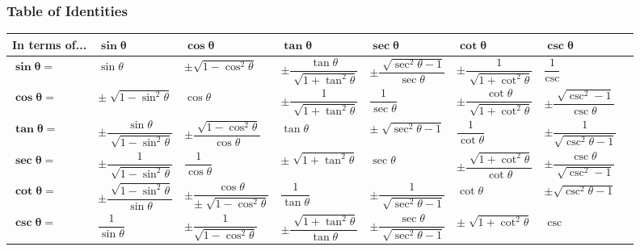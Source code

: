 \documentclass[]{report}
\begin{document}
\subsubsection{Table of Identities}
\begin{tabular}{ |l|l|l|l|l|l|l|l| } 
\hline
In terms of...			& $\mathbf{\sin\theta}$								& $\mathbf{\cos\theta}$										& $\mathbf{\tan\theta}$								& $\mathbf{\sec\theta}$									& $\mathbf{\cot\theta}$								& $\mathbf{\csc\theta}$ 
\\ \hline

$\mathbf{\sin\theta}=$	& $\sin\theta$										& $\pm\sqrt{1-\cos^2\theta}$ 								& $\pm\dfrac{\tan\theta}{\sqrt[]{1+\tan^2\theta}}$	& $\pm\dfrac{\sqrt[]{\sec^2\theta-1}}{\sec\theta}$		& $\pm\dfrac{1}{\sqrt[]{1+\cot^2\theta}}$			& $\dfrac{1}{\csc}$
\\\hline

$\mathbf{\cos\theta}=$	& $\pm\sqrt[]{1-\sin^2\theta}$ 						& $\cos\theta$ 												& $\pm\dfrac{1}{\sqrt[]{1+\tan^2\theta}}$ 			& $\dfrac{1}{\sec\theta}$ 								& $\pm\dfrac{\cot\theta}{\sqrt[]{1+\cot^2\theta}}$ 	& $\pm\dfrac{\sqrt[]{\csc^2-1}}{\csc\theta}$
\\\hline

$\mathbf{\tan\theta}=$	& $\pm\dfrac{\sin\theta}{\sqrt[]{1-\sin^2\theta}}$ 	& $\pm\dfrac{\sqrt[]{1-\cos^2\theta}}{\cos\theta}$ 			& $\tan\theta$ 										& $\pm\sqrt[]{\sec^2\theta-1}$ 							& $\dfrac{1}{\cot\theta}$ 							& $\pm\dfrac{1}{\sqrt{\csc^2\theta-1}}$
\\\hline

$\mathbf{\sec\theta}=$	& $\pm\dfrac{1}{\sqrt[]{1-\sin^2\theta}}$ 			& $\dfrac{1}{\cos\theta}$ 									& $\pm\sqrt[]{1+\tan^2\theta}$ 						& $\sec\theta$ 											& $\pm\dfrac{\sqrt[]{1+\cot^2\theta}}{\cot\theta}$ 	& $\pm\dfrac{\csc\theta}{\sqrt[]{\csc^2-1}}$
\\\hline

$\mathbf{\cot\theta}=$	& $\pm\dfrac{\sqrt[]{1-\sin^2\theta}}{\sin\theta}$ 	& $\pm\dfrac{\cos\theta}{\pm\sqrt[]{1-\cos^2\theta}}$ 		& $\dfrac{1}{\tan\theta}$ 							& $\pm\dfrac{1}{\sqrt[]{\sec^2\theta-1}}$ 				& $\cot\theta$ 										& $\pm\sqrt{\csc^2\theta-1}$
\\\hline

$\mathbf{\csc\theta}=$	& $\dfrac{1}{\sin\theta}$ 							& $\pm\dfrac{1}{\sqrt{1-\cos^2\theta}}$						& $\pm\dfrac{\sqrt[]{1+\tan^2\theta}}{\tan\theta}$	& $\pm\dfrac{\sec\theta}{\sqrt[]{\sec^2\theta-1}}$		& $\pm\sqrt[]{1+\cot^2\theta}$						& $\csc$
\\\hline
\end{tabular}
\end{document}
